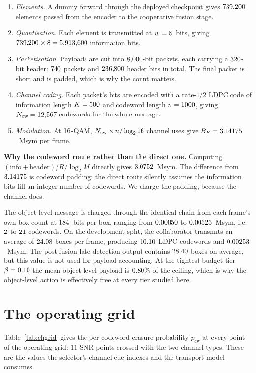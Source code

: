 \documentclass[journal]{IEEEtran}
\begin{document}
\begin{enumerate}
\item \emph{Elements.} A dummy forward through the deployed checkpoint gives $739{,}200$ elements
passed from the encoder to the cooperative fusion stage.
\item \emph{Quantisation.} Each element is transmitted at $w = 8$~bits, giving
$739{,}200 \times 8 = 5{,}913{,}600$ information bits.
\item \emph{Packetisation.} Payloads are cut into $8{,}000$-bit packets, each carrying a
$320$-bit header: $740$ packets and $236{,}800$ header bits in total. The final
packet is short and is padded, which is why the count matters.
\item \emph{Channel coding.} Each packet's bits are encoded with a rate-$1/2$ LDPC code of
information length $K = 500$ and codeword length $n = 1000$, giving $N_{\mathrm{cw}} = 12{,}567$
codewords for the whole message.
\item \emph{Modulation.} At $16$-QAM, $N_{\mathrm{cw}} \times n / \log_2 16$ channel uses give
$B_F = 3.14175$~Msym per frame.
\end{enumerate}

\textbf{Why the codeword route rather than the direct one.} Computing
$(\text{info} + \text{header}) / R / \log_2 M$ directly gives $3.0752$~Msym. The difference
from $3.14175$ is codeword padding: the direct route silently assumes the information bits fill an
integer number of codewords. We charge the padding, because the channel does.

The object-level message is charged through the identical chain from each frame's own box count at
$184$~bits per box, ranging from $0.00050$ to $0.00525$~Msym, i.e.\ $2$ to $21$
codewords. On the development split, the collaborator transmits an average of
$24.08$ boxes per frame, producing
$10.10$ LDPC codewords and $0.00253$~Msym. The post-fusion late-detection output contains
$28.40$ boxes on average, but this value is not used for payload accounting.
At the tightest budget tier $\beta = 0.10$ the mean object-level payload is
$0.80$\% of the ceiling, which is why the object-level action is effectively free at
every tier studied here.

\section{The operating grid}
Table~\ref{tab:chgrid} gives the per-codeword erasure probability $p_{\mathrm{cw}}$ at every point
of the operating grid: $11$ SNR points crossed with the two channel types. These are the values the
selector's channel cue indexes and the transport model consumes.
\end{document}
